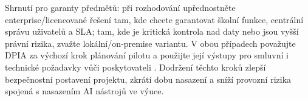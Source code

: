 Shrnutí pro garanty předmětů: při rozhodování upřednostněte enterprise/licencované řešení tam, kde chcete garantovat školní funkce, centrální správu uživatelů a SLA; tam, kde je kritická kontrola nad daty nebo jsou vyšší právní rizika, zvažte lokální/on‑premise variantu. V obou případech považujte DPIA za výchozí krok plánování pilotu a použijte její výstupy pro smluvní i technické požadavky vůči poskytovateli \cite{kb_malinka_chatgpt_ve_vyuce_dva_roky_pote_2024_pdf_90bc3aaf_page_12_1, kb_ai_101_tipu_pdf_04e4a115_page_15_2}. Dodržení těchto kroků zlepší bezpečnostní postavení projektu, zkrátí dobu nasazení a sníží provozní rizika spojená s nasazením AI nástrojů ve výuce.